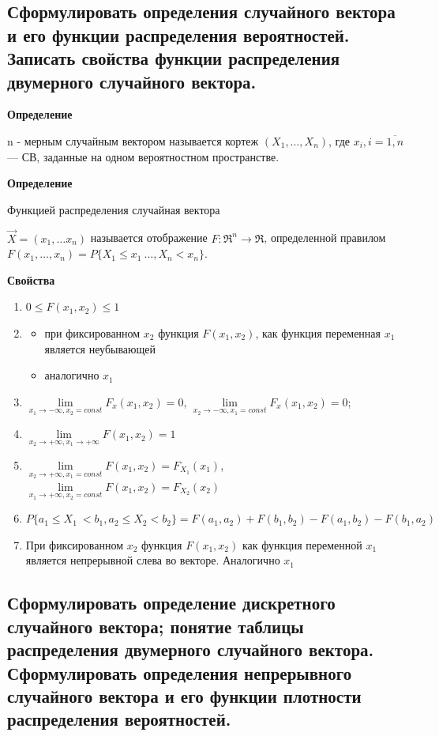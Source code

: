 \subsection{Сформулировать определения случайного вектора и его функции распределения вероятностей. Записать свойства функции распределения двумерного случайного вектора.}

\textbf{Определение}

n - мерным случайным вектором называется кортеж $(X_1, \dots, X_n)$, где $x_i, i=\overline{1,n}$ --- СВ, заданные на одном вероятностном пространстве.

\textbf{Определение}

Функцией распределения случайная вектора

$\overrightarrow{X} = (x_1, \dots x_n)$ называется отображение $F: \Re^n \rightarrow \Re$, определенной правилом $F(x_1, \dots, x_n) = P\{X_1 \leq x_1\ \dots, X_n < x_n\}$.

\textbf{Свойства}

\begin{enumerate}[label=\arabic*.]
	\item $0 \leq F(x_1, x_2) \leq 1$
	\item \begin{itemize}
		\item при фиксированном $x_2$ функция $F(x_1, x_2)$, как функция переменная $x_1$ является неубывающей
		\item аналогично $x_1$
	\end{itemize}
	\item $\lim\limits_{x_1 \rightarrow -\infty, x_2 = const}F_x(x_1, x_2) = 0$, $\lim\limits_{x_2 \rightarrow -\infty, x_1 = const}F_x(x_1, x_2) = 0$;
	\item $\lim\limits_{x_2 \rightarrow +\infty, x_1 \rightarrow +\infty}F(x_1, x_2) = 1$
	\item $\lim\limits_{x_2 \rightarrow +\infty, x_1 = const}F(x_1, x_2) = F_{X_1}(x_1)$, $\lim\limits_{x_1 \rightarrow +\infty, x_2 = const}F(x_1, x_2) = F_{X_2}(x_2)$
	\item $P\{a_1 \leq X_1\ < b_1, a_2 \leq X_2 < b_2\} = F(a_1, a_2) + F(b_1, b_2) - F(a_1, b_2) - F(b_1, a_2)$
	\item При фиксированном $x_2$ функция $F(x_1, x_2)$ как функция переменной $x_1$ является непрерывной слева во векторе. Аналогично $x_1$
\end{enumerate}

\subsection{Сформулировать определение дискретного случайного вектора; понятие таблицы распределения двумерного случайного вектора. Сформулировать определения непрерывного случайного вектора и его функции плотности распределения вероятностей.}

